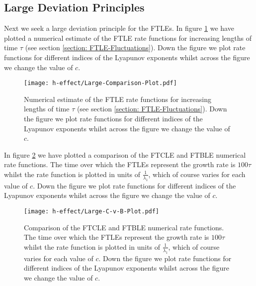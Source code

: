 \subsection{Large Deviation Principles}

Next we seek a large deviation principle for the FTLEs. In figure \ref{fig: h-Rate-Convergence} we have plotted a numerical estimate of the FTLE rate functions for increasing lengths of time $\tau$ (see section \ref{section: FTLE-Fluctuations}). Down the figure we plot rate functions for different indices of the Lyapunov exponents whilst across the figure we change the value of $c$.

\begin{figure}
    \centering
    \texttt{[image: h-effect/Large-Comparison-Plot.pdf]}
    \caption{Numerical estimate of the FTLE rate functions for increasing lengths of time $\tau$ (see section \ref{section: FTLE-Fluctuations}). Down the figure we plot rate functions for different indices of the Lyapunov exponents whilst across the figure we change the value of $c$.}
    \label{fig: h-Rate-Convergence}
\end{figure}

In figure \ref{fig: h-Rate-C-v-B} we have plotted a comparison of the FTCLE and FTBLE numerical rate functions. The time over which the FTLEs represent the growth rate is $100 \tau$ whilst the rate function is plotted in units of $\frac{1}{\lambda _1}$, which of course varies for each value of $c$. Down the figure we plot rate functions for different indices of the Lyapunov exponents whilst across the figure we change the value of $c$.

\begin{figure}
    \centering
    \texttt{[image: h-effect/Large-C-v-B-Plot.pdf]}
    \caption{Comparison of the FTCLE and FTBLE numerical rate functions. The time over which the FTLEs represent the growth rate is $100 \tau$ whilst the rate function is plotted in units of $\frac{1}{\lambda _1}$, which of course varies for each value of $c$. Down the figure we plot rate functions for different indices of the Lyapunov exponents whilst across the figure we change the value of $c$.}
    \label{fig: h-Rate-C-v-B}
\end{figure}
